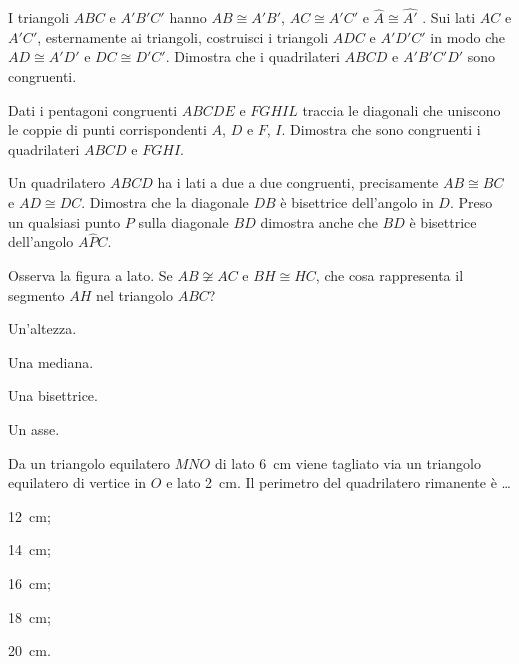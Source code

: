 \begin{multicols}{2}
\begin{esercizio}
\label{ese:2.96}
I triangoli \(ABC\) e \(A'B'C'\) hanno \(AB\cong A'B'\), \(AC\cong A'C'\) e 
\(\widehat{A}\cong\widehat{A'}\) . Sui lati \(AC\) e \(A'C'\), esternamente 
ai triangoli, costruisci i triangoli \(ADC\) e \(A'D'C'\) in modo che 
\(AD\cong A'D'\) e \(DC\cong D'C'\). Dimostra che i quadrilateri \(ABCD\) e 
\(A'B'C'D'\) sono congruenti.
\end{esercizio}

\begin{esercizio}
\label{ese:2.97}
Dati i pentagoni congruenti \(ABCDE\) e \(FGHIL\) traccia le diagonali 
che uniscono le coppie di punti corrispondenti \(A\), \(D\) e \(F\), \(I\). 
Dimostra che sono congruenti i quadrilateri \(ABCD\) e \(FGHI\).
\end{esercizio}

\begin{esercizio}
\label{ese:2.98}
Un quadrilatero \(ABCD\) ha i lati a due a due congruenti, precisamente 
\(AB\cong BC\) e \(AD\cong DC\). Dimostra che la diagonale \(DB\) è 
bisettrice dell'angolo in \(D\). Preso un qualsiasi punto \(P\) sulla 
diagonale \(BD\) dimostra anche che \(BD\) è bisettrice dell'angolo 
\(A\widehat{P}C\).
\end{esercizio}

\end{multicols}

\begin{esercizio}
\label{ese:2.99}
Osserva la figura a lato. Se \(AB\not\cong AC\) e \(BH\cong HC\), che 
cosa rappresenta il segmento \(AH\) nel triangolo \(ABC\)?\\
\begin{minipage}{.5\linewidth}
\begin{enumeratea}
\item Un'altezza.
\item Una mediana.
\item Una bisettrice.
\item Un asse.
\end{enumeratea}
\end{minipage}\hfil
\begin{minipage}{.2\linewidth}
  \centering
    
\end{minipage}
\end{esercizio}

\begin{esercizio}
\label{ese:2.100}
Da un triangolo equilatero \(MNO\) di lato 6~cm viene tagliato via un 
triangolo equilatero di vertice in \(O\) e lato 2~cm. Il perimetro del 
quadrilatero rimanente è \ldots
\begin{multicols}{5}
\begin{enumeratea}
\item 12~cm;
\item 14~cm;
\item 16~cm;
\item 18~cm;
\item 20~cm.
\end{enumeratea}
\end{multicols}
\end{esercizio}


